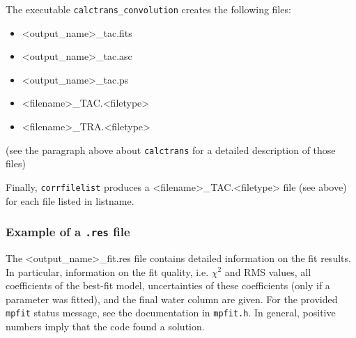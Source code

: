 The executable {\tt calctrans\_convolution} creates the following files:
\begin{itemize}
\item <{\sc output\_name}>\_tac.fits
\item <{\sc output\_name}>\_tac.asc
\item <{\sc output\_name}>\_tac.ps
\item <{\sc filename}>\_TAC.<filetype>
\item <{\sc filename}>\_TRA.<filetype>
\end{itemize}
(see the paragraph above about {\tt calctrans} for a detailed description of
those files)

Finally, {\tt corrfilelist} produces a <filename>\_TAC.<filetype> file (see
above) for each file listed in {\sc listname}.

\subsubsection{Example of a {\tt .res} file}\label{sec:resfile}
The <{\sc output\_name}>\_fit.res file contains detailed information on the fit
results. In particular, information on the fit quality, i.e. $\chi^2$ and RMS
values, all coefficients of the best-fit model, uncertainties of these
coefficients (only if a parameter was fitted), and the final water column are
given. For the provided {\tt mpfit} status message, see the documentation in
{\tt mpfit.h}. In general, positive numbers imply that the code found a
solution.

